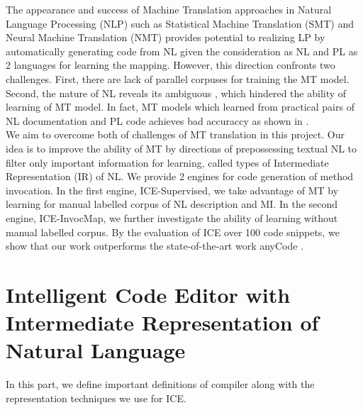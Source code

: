 \documentclass[sigconf,review]{acmart}
\begin{document}
The appearance and success of Machine Translation approaches in Natural Language Processing (NLP) such as Statistical Machine Translation (SMT) \cite{015,016} and Neural Machine Translation (NMT) \cite{038} provides potential to realizing LP by automatically generating code from NL given the consideration as NL and PL as 2 languages for learning the mapping. However, this direction confronts two challenges. First, there are lack of parallel corpuses for training the MT model. Second, the nature of NL reveals its ambiguous \cite{025}, which hindered the ability of learning of MT model. In fact, MT models which learned from practical pairs of NL documentation and PL code achieves bad accuraccy as shown in \cite{010}.
\\
We aim to overcome both of challenges of MT translation in this project. Our idea is to improve the ability of MT by directions of prepossessing textual NL to filter only important information for learning, called types of Intermediate Representation (IR) of NL. We provide 2 engines for code generation of method invocation. In the first engine, ICE-Supervised, we take advantage of MT by learning for manual labelled corpus of NL description and MI. In the second engine, ICE-InvocMap, we further investigate the ability of learning without manual labelled corpus. By the evaluation of ICE over 100 code snippets, we show that our work outperforms the state-of-the-art work anyCode \cite{007}.

\section{Intelligent Code Editor with Intermediate Representation of Natural Language}
In this part, we define important definitions of compiler along with the representation techniques we use for ICE.
\end{document}
